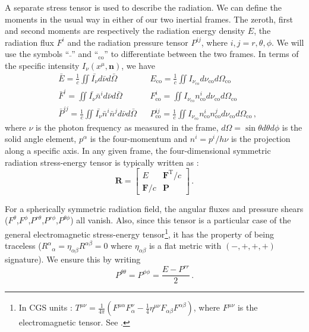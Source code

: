 \documentclass[../main.tex]{subfiles}
\begin{document}
A separate stress tensor is used to describe the radiation. We can define the moments in the usual way in either of our two inertial frames. The zeroth, first and second moments are respectively the radiation energy density $E$, the radiation flux $F^i$ and the radiation pressure tensor $P^{ij}$, where $i,j=r,\theta,\phi$.  We will use the symbols ``$\bar{\;}$'' and ``$_\text{co}$'' to differentiate between the two frames.  In terms of the specific intensity $I_\nu(x^\mu,\bm{n})$, we have
\begin{align}
    &\bar{E}=\frac{1}{c}\iint \bar{I_\nu}d\bar{\nu}d\bar{\Omega}&& E_\text{co}=\frac{1}{c}\iint I_{\nu_\text{co}}d\nu_\text{co}d\Omega_\text{co}\nonumber\\
    &\bar{F}^i=\iint \bar{I_\nu}\bar{n}^id\bar{\nu}d\bar{\Omega}&& F^i_\text{co}=\iint I_{\nu_\text{co}}n^i_\text{co}d\nu_\text{co}d\Omega_\text{co}\nonumber\\
    &\bar{P}^{ij}=\frac{1}{c}\iint \bar{I_\nu}\bar{n}^i\bar{n}^jd\bar{\nu}d\bar{\Omega}&& P^{ij}_\text{co}=\frac{1}{c}\iint I_{\nu_\text{co}}n^i_\text{co}n^j_\text{co}d\nu_\text{co}d\Omega_\text{co} \,,
\end{align}
where $\nu$ is the photon frequency as measured in the frame, $d\Omega=\sin\theta d\theta d\phi$ is the solid angle element, $p^\alpha$ is the four-momentum and $n^i=p^i/h\nu$ is the projection along a specific axis.  In any given frame, the four-dimensional symmetric radiation stress-energy tensor is typically written as \citep{MihalasMihalas1984}:
\begin{equation}
    \bm{R}=\begin{bmatrix}E&\bm{F}^\text{T}/c\\\bm{F}/c&\bm{P}\end{bmatrix}\,.
\end{equation}

For a spherically symmetric radiation field, the angular fluxes and pressure shears ($F^\theta$,$F^\phi$,$P^{r\theta}$,$P^{r\phi}$,$P^{\theta\phi}$) all vanish.  Also, since this tensor is a particular case of the general electromagnetic stress-energy tensor\footnote{In CGS units : $T^{\mu\nu}=
\frac{1}{4\pi}\left(F^{\mu\alpha}F^\nu_\alpha-\frac{1}{4}\eta^{\mu\nu}F_{\alpha\beta}F^{\alpha\beta}\right)$, where $F^{\mu\nu}$ is the electromagnetic tensor.  See \citet{Carroll2004}.}, it has the property of being traceless ($R^\alpha{}_\alpha=\eta_{\alpha\beta}R^{\alpha\beta}=0$ where $\eta_{\alpha\beta}$ is a flat metric with $(-,+,+,+)$ signature).  We ensure this by writing
\begin{equation}
    P^{\theta\theta}=P^{\phi\phi}=\frac{E-P^{rr}}{2}\, .
\end{equation}
\end{document}
